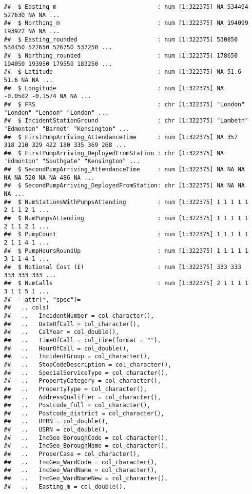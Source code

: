 \documentclass[
]{article}
\begin{document}
\begin{verbatim}
##  $ Easting_m                             : num [1:322375] NA 534494 527630 NA NA ...
##  $ Northing_m                            : num [1:322375] NA 194099 193922 NA NA ...
##  $ Easting_rounded                       : num [1:322375] 530850 534450 527650 526750 537250 ...
##  $ Northing_rounded                      : num [1:322375] 178650 194050 193950 179550 183250 ...
##  $ Latitude                              : num [1:322375] NA 51.6 51.6 NA NA ...
##  $ Longitude                             : num [1:322375] NA -0.0582 -0.1574 NA NA ...
##  $ FRS                                   : chr [1:322375] "London" "London" "London" "London" ...
##  $ IncidentStationGround                 : chr [1:322375] "Lambeth" "Edmonton" "Barnet" "Kensington" ...
##  $ FirstPumpArriving_AttendanceTime      : num [1:322375] NA 357 318 210 329 422 180 335 369 268 ...
##  $ FirstPumpArriving_DeployedFromStation : chr [1:322375] NA "Edmonton" "Southgate" "Kensington" ...
##  $ SecondPumpArriving_AttendanceTime     : num [1:322375] NA NA NA NA NA 520 NA NA 486 NA ...
##  $ SecondPumpArriving_DeployedFromStation: chr [1:322375] NA NA NA NA ...
##  $ NumStationsWithPumpsAttending         : num [1:322375] 1 1 1 1 1 2 1 1 2 1 ...
##  $ NumPumpsAttending                     : num [1:322375] 1 1 1 1 1 2 1 1 2 1 ...
##  $ PumpCount                             : num [1:322375] 1 1 1 1 1 2 1 1 4 1 ...
##  $ PumpHoursRoundUp                      : num [1:322375] 1 1 1 1 1 3 1 1 4 1 ...
##  $ Notional Cost (£)                     : num [1:322375] 333 333 333 333 333 ...
##  $ NumCalls                              : num [1:322375] 2 1 1 1 1 3 1 1 5 1 ...
##  - attr(*, "spec")=
##   .. cols(
##   ..   IncidentNumber = col_character(),
##   ..   DateOfCall = col_character(),
##   ..   CalYear = col_double(),
##   ..   TimeOfCall = col_time(format = ""),
##   ..   HourOfCall = col_double(),
##   ..   IncidentGroup = col_character(),
##   ..   StopCodeDescription = col_character(),
##   ..   SpecialServiceType = col_character(),
##   ..   PropertyCategory = col_character(),
##   ..   PropertyType = col_character(),
##   ..   AddressQualifier = col_character(),
##   ..   Postcode_full = col_character(),
##   ..   Postcode_district = col_character(),
##   ..   UPRN = col_double(),
##   ..   USRN = col_double(),
##   ..   IncGeo_BoroughCode = col_character(),
##   ..   IncGeo_BoroughName = col_character(),
##   ..   ProperCase = col_character(),
##   ..   IncGeo_WardCode = col_character(),
##   ..   IncGeo_WardName = col_character(),
##   ..   IncGeo_WardNameNew = col_character(),
##   ..   Easting_m = col_double(),

\end{verbatim}
\end{document}
